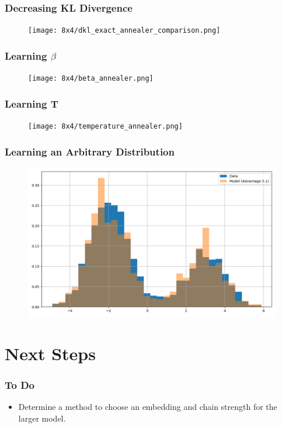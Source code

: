 \documentclass{beamer}
\begin{document}
\begin{frame}
    \frametitle{Decreasing KL Divergence}
    \begin{figure}
        \texttt{[image: 8x4/dkl\_exact\_annealer\_comparison.png]}
    \end{figure}
\end{frame}
\begin{frame}
    \frametitle{Learning \( \beta \)}
    \begin{figure}
        \texttt{[image: 8x4/beta\_annealer.png]}
    \end{figure}
\end{frame}
\begin{frame}
    \frametitle{Learning T}
    \begin{figure}
        \texttt{[image: 8x4/temperature\_annealer.png]}
    \end{figure}
\end{frame}
\begin{frame}
    \frametitle{Learning an Arbitrary Distribution}
    \begin{figure}
        \includegraphics[width=1\linewidth]{8x4/hist_comparison_annealer.png}
    \end{figure}
\end{frame}



\section{Next Steps}

\begin{frame}
    \frametitle{To Do}
    \begin{itemize}
        \item Determine a method to choose an embedding and chain strength for the larger model.
    \end{itemize}
\end{frame}
\end{document}
